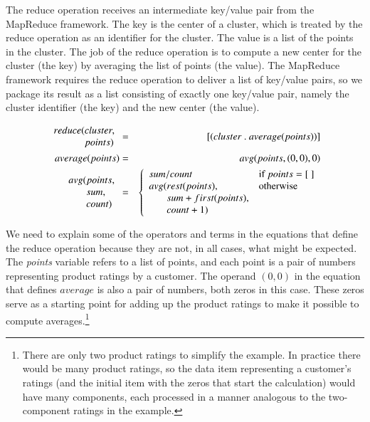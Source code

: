 The reduce operation receives
an intermediate key/value pair from the MapReduce framework.
The key is the center of a cluster, which is treated by the reduce operation
as an identifier for the cluster.
The value is a list of the points in the cluster.
The job of the reduce operation is to compute a new
center for the cluster (the key) by averaging the list of points (the value).
The MapReduce framework requires the reduce operation to deliver
a list of key/value pairs, so we package its result as a list consisting
of exactly one key/value pair, namely the cluster identifier (the key) and the
new center (the value).
\begin{spacing}{0.9}
\begin{eqnarray*}
    \begin{array}{l@{}l}
        reduce(&cluster, \\
               &points)
    \end{array} &=& [ ( cluster ~.~ average(points) ) ] \\
average(points) &=& avg(points, (0,0), 0) \\
\begin{array}{l@{}l}
    avg(&points, \\
        &sum, \\
        &count)
\end{array} &=&
    \left\{
        \begin{array}{l@{}ll}
            \multicolumn{2}{l}{sum / count} & \mbox{if } points = [~] \\
            avg(& rest(points),             & \mbox{otherwise} \\
                & sum+first(points),        & \\
                & count+1)                  & \\
        \end{array}
    \right.
\end{eqnarray*}
\end{spacing}

We need to explain some of the operators and terms
in the equations that define the reduce operation
because they are not, in all cases, what might be expected.
The \emph{points} variable refers to a list of points,
and each point is a pair of numbers representing product ratings
by a customer.
The operand $(0,0)$ in the equation that defines $average$ is
also a pair of numbers, both zeros in this case.
These zeros serve as a starting point for adding
up the product ratings to make it possible to compute
averages.\footnote{There are only two product ratings
to simplify the example. In practice there would be
many product ratings, so the data item representing
a customer's ratings (and the initial item with the
zeros that start the calculation)
would have many components, each processed in a manner analogous
to the two-component ratings in the example.}

